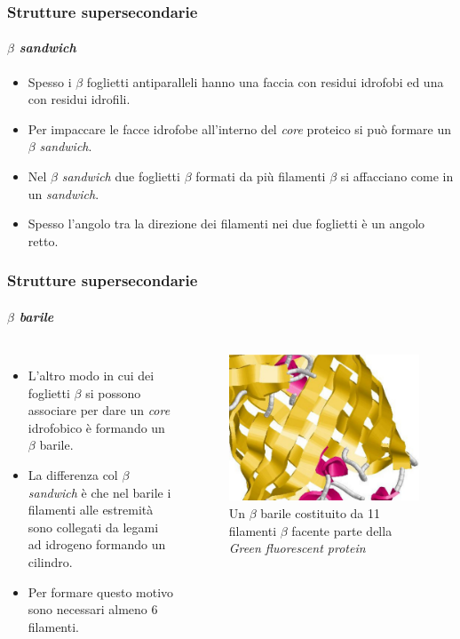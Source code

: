 \documentclass{beamer}
\begin{document}
\begin{frame}
\frametitle{Strutture supersecondarie}
  \framesubtitle{\itshape{$\beta$ \emph{sandwich}}}
\begin{itemize}
\item Spesso i $\beta$ foglietti antiparalleli hanno una faccia con residui idrofobi ed una con residui idrofili.
\pause  \item Per impaccare le facce idrofobe all'interno del \emph{core} proteico si può formare un $\beta$ \emph{sandwich}.
\pause  \item Nel $\beta$ \emph{sandwich} due foglietti $\beta$ formati da più filamenti $\beta$ si affacciano come in un \emph{sandwich}.
\item Spesso l'angolo tra la direzione dei filamenti nei due foglietti è un angolo retto.
\end{itemize}
\end{frame}
\begin{frame}
\frametitle{Strutture supersecondarie}
  \framesubtitle{\itshape{$\beta$ barile}}
\begin{columns}
\begin{itemize}
 \item L'altro modo in cui dei foglietti $\beta$ si possono associare per dare un \emph{core} idrofobico è formando un $\beta$ barile.
\pause   \item La differenza col $\beta$ \emph{sandwich} è che nel barile i filamenti alle estremità sono collegati da legami ad idrogeno formando un cilindro.
\pause   \item Per formare questo motivo sono necessari almeno 6 filamenti.
\end{itemize}
 \begin{figure}
\centering
\includegraphics[scale=0.22]{betabarrel.pdf}\caption{Un $\beta$ barile costituito da 11 filamenti $\beta$ facente parte della \emph{Green fluorescent protein}\citep{PDB}}\label{bbarrel}
\end{figure} 
\end{columns}
\end{frame}
\end{document}
